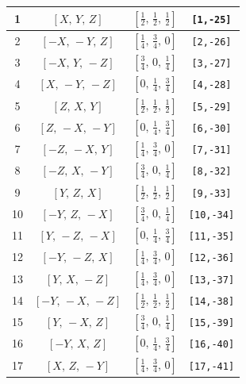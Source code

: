 \documentclass[fleqn,8pt]{jsarticle}
\begin{document}
\begin{longtable}{cccc}
1 & $\left[ X,\, Y,\, Z \right]$ & $\left[ \frac{1}{2},\, \frac{1}{2},\, \frac{1}{2} \right]$ & {\tt [1,-25]} \\ \hline
2 & $\left[ - X,\, - Y,\, Z \right]$ & $\left[ \frac{1}{4},\, \frac{3}{4},\, 0 \right]$ & {\tt [2,-26]} \\ \hline
3 & $\left[ - X,\, Y,\, - Z \right]$ & $\left[ \frac{3}{4},\, 0,\, \frac{1}{4} \right]$ & {\tt [3,-27]} \\ \hline
4 & $\left[ X,\, - Y,\, - Z \right]$ & $\left[ 0,\, \frac{1}{4},\, \frac{3}{4} \right]$ & {\tt [4,-28]} \\ \hline
5 & $\left[ Z,\, X,\, Y \right]$ & $\left[ \frac{1}{2},\, \frac{1}{2},\, \frac{1}{2} \right]$ & {\tt [5,-29]} \\ \hline
6 & $\left[ Z,\, - X,\, - Y \right]$ & $\left[ 0,\, \frac{1}{4},\, \frac{3}{4} \right]$ & {\tt [6,-30]} \\ \hline
7 & $\left[ - Z,\, - X,\, Y \right]$ & $\left[ \frac{1}{4},\, \frac{3}{4},\, 0 \right]$ & {\tt [7,-31]} \\ \hline
8 & $\left[ - Z,\, X,\, - Y \right]$ & $\left[ \frac{3}{4},\, 0,\, \frac{1}{4} \right]$ & {\tt [8,-32]} \\ \hline
9 & $\left[ Y,\, Z,\, X \right]$ & $\left[ \frac{1}{2},\, \frac{1}{2},\, \frac{1}{2} \right]$ & {\tt [9,-33]} \\ \hline
10 & $\left[ - Y,\, Z,\, - X \right]$ & $\left[ \frac{3}{4},\, 0,\, \frac{1}{4} \right]$ & {\tt [10,-34]} \\ \hline
11 & $\left[ Y,\, - Z,\, - X \right]$ & $\left[ 0,\, \frac{1}{4},\, \frac{3}{4} \right]$ & {\tt [11,-35]} \\ \hline
12 & $\left[ - Y,\, - Z,\, X \right]$ & $\left[ \frac{1}{4},\, \frac{3}{4},\, 0 \right]$ & {\tt [12,-36]} \\ \hline
13 & $\left[ Y,\, X,\, - Z \right]$ & $\left[ \frac{1}{4},\, \frac{3}{4},\, 0 \right]$ & {\tt [13,-37]} \\ \hline
14 & $\left[ - Y,\, - X,\, - Z \right]$ & $\left[ \frac{1}{2},\, \frac{1}{2},\, \frac{1}{2} \right]$ & {\tt [14,-38]} \\ \hline
15 & $\left[ Y,\, - X,\, Z \right]$ & $\left[ \frac{3}{4},\, 0,\, \frac{1}{4} \right]$ & {\tt [15,-39]} \\ \hline
16 & $\left[ - Y,\, X,\, Z \right]$ & $\left[ 0,\, \frac{1}{4},\, \frac{3}{4} \right]$ & {\tt [16,-40]} \\ \hline
17 & $\left[ X,\, Z,\, - Y \right]$ & $\left[ \frac{1}{4},\, \frac{3}{4},\, 0 \right]$ & {\tt [17,-41]} \\ \hline

\end{longtable}
\end{document}

